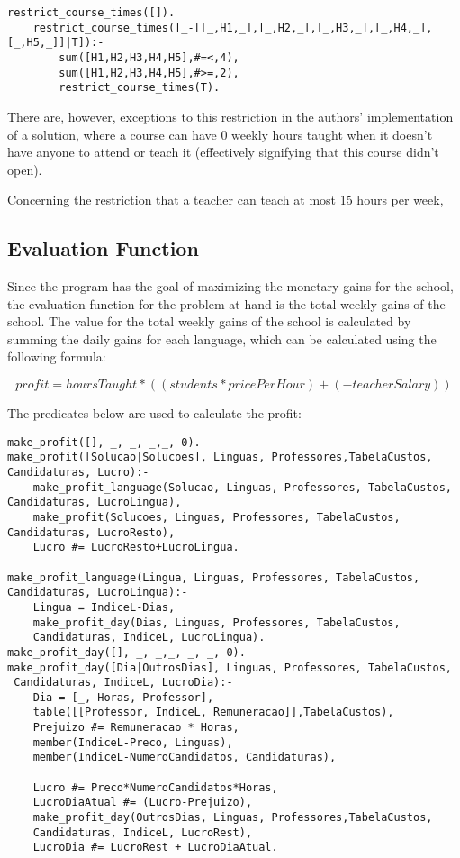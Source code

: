 \documentclass{llncs}
\begin{document}
\begin{verbatim}
restrict_course_times([]).
	restrict_course_times([_-[[_,H1,_],[_,H2,_],[_,H3,_],[_,H4,_],[_,H5,_]]|T]):-
		sum([H1,H2,H3,H4,H5],#=<,4),
		sum([H1,H2,H3,H4,H5],#>=,2),
		restrict_course_times(T).
\end{verbatim}

There are, however, exceptions to this restriction in the authors' implementation of a solution, where a course can have 0 weekly hours taught when it doesn't have anyone to attend or teach it (effectively signifying that this course didn't open).

Concerning the restriction that a teacher can teach at most 15 hours per week,

\subsection{Evaluation Function}
Since the program has the goal of maximizing the monetary gains for the school, the evaluation function for the problem at hand is the total weekly gains of the school. The value for the total weekly gains of the school is calculated by summing the daily gains for each language, which can be calculated using the following formula:

\begin{equation}
	profit = hoursTaught*((students*pricePerHour)+(-teacherSalary))
\end{equation}

The predicates below are used to calculate the profit:
\begin{verbatim}
make_profit([], _, _, _,_, 0).
make_profit([Solucao|Solucoes], Linguas, Professores,TabelaCustos, Candidaturas, Lucro):-
	make_profit_language(Solucao, Linguas, Professores, TabelaCustos, Candidaturas, LucroLingua),
	make_profit(Solucoes, Linguas, Professores, TabelaCustos, Candidaturas, LucroResto),
	Lucro #= LucroResto+LucroLingua.

make_profit_language(Lingua, Linguas, Professores, TabelaCustos, 
Candidaturas, LucroLingua):-
	Lingua = IndiceL-Dias,
	make_profit_day(Dias, Linguas, Professores, TabelaCustos, 
	Candidaturas, IndiceL, LucroLingua).
make_profit_day([], _, _,_, _, _, 0).
make_profit_day([Dia|OutrosDias], Linguas, Professores, TabelaCustos,
 Candidaturas, IndiceL, LucroDia):-
	Dia = [_, Horas, Professor],
	table([[Professor, IndiceL, Remuneracao]],TabelaCustos),
	Prejuizo #= Remuneracao * Horas,
	member(IndiceL-Preco, Linguas),
	member(IndiceL-NumeroCandidatos, Candidaturas),

	Lucro #= Preco*NumeroCandidatos*Horas,
	LucroDiaAtual #= (Lucro-Prejuizo),
	make_profit_day(OutrosDias, Linguas, Professores,TabelaCustos, 
	Candidaturas, IndiceL, LucroRest),
	LucroDia #= LucroRest + LucroDiaAtual.
\end{verbatim}
\end{document}

